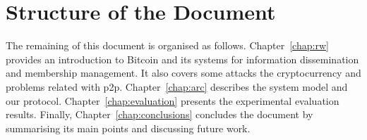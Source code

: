 \section{Structure of the Document}
\label{chap:sotd}

The remaining of this document is organised as follows. Chapter~\ref{chap:rw} provides an introduction to Bitcoin and its systems for information dissemination and membership management. It also covers some attacks the cryptocurrency and problems related with \acrlong{p2p}. Chapter~\ref{chap:arc} describes the system model and our protocol. Chapter~\ref{chap:evaluation} presents the experimental evaluation results. Finally, Chapter~\ref{chap:conclusions} concludes the document by summarising its main points and discussing future work.


%
%

